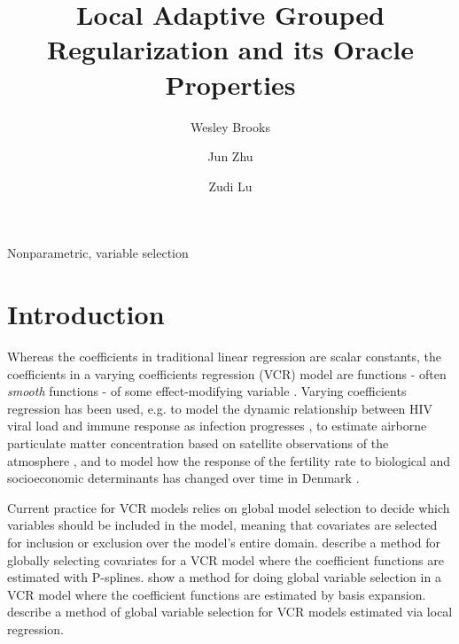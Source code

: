\documentclass[authoryear,review, 12pt]{elsarticle}
\begin{document}
\begin{frontmatter}

\title{Local Adaptive Grouped Regularization and its Oracle Properties}


\author[wrbrooks]{Wesley Brooks}

\author[jzhu]{Jun Zhu}

\author[zlu]{Zudi Lu}

\address[wrbrooks]{Department of Statistics, University of Wisconsin, Madison, WI 53706}
\address[jzhu]{Department of Statistics and Department of Entomology, University of Wisconsin, Madison, WI 53706}
\address[zlu]{School of Mathematical Sciences, The University of Southampton Highfield, Southampton UK}

\begin{abstract}

\end{abstract}

\begin{keyword}
Nonparametric, variable selection
\end{keyword}

\end{frontmatter}

\section{Introduction}

Whereas the coefficients in traditional linear regression are scalar
constants, the coefficients in a varying coefficients regression (VCR)
model are functions - often \emph{smooth} functions - of some effect-modifying
variable \citep{Cleveland-Grosse-1991,Hastie-Tibshirani-1993}. Varying
coefficients regression has been used, e.g. to model the dynamic relationship
between HIV viral load and immune response as infection progresses
\citep{Liang-Wu-Carroll-2003}, to estimate airborne particulate matter
concentration based on satellite observations of the atmosphere \citep{Pelletier-Santer-Vidot-2007},
and to model how the response of the fertility rate to biological
and socioeconomic determinants has changed over time in Denmark \citep{Kohler-Rodgers-Christensen-2003}.

Current practice for VCR models relies on global model selection to
decide which variables should be included in the model, meaning that
covariates are selected for inclusion or exclusion over the model's
entire domain. \citet{Antoniadis:2012a} describe a method for globally
selecting covariates for a VCR model where the coefficient functions
are estimated with P-splines. \citet{Wang-2008a} show a method for
doing global variable selection in a VCR model where the coefficient
functions are estimated by basis expansion. \citet{Wang-Xia-2009}
describe a method of global variable selection for VCR models estimated
via local regression.
\end{document}
